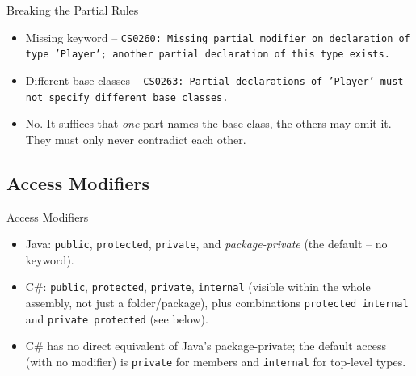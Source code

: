 \begin{solutionframe}{Breaking the Partial Rules}
  \begin{itemize}
    \item Missing keyword -- \texttt{CS0260: Missing partial modifier on
      declaration of type 'Player'; another partial declaration of this type
      exists.}
    \item Different base classes -- \texttt{CS0263: Partial declarations of
      'Player' must not specify different base classes.}
    \item No. It suffices that \emph{one} part names the base class, the others
      may omit it. They must only never contradict each other.
  \end{itemize}
  \vspace{4ex}

\end{solutionframe}

\subsection{Access Modifiers}

\begin{frame}{Access Modifiers}
  \begin{itemize}
    \item Java: \texttt{public}, \texttt{protected}, \texttt{private},
      and \emph{package-private} (the default -- no keyword).
    \item C\#: \texttt{public}, \texttt{protected}, \texttt{private},
      \texttt{internal} (visible within the whole assembly, not just a
      folder/package), plus combinations
      \texttt{protected internal} and \texttt{private protected} (see below).
    \item C\# has no direct equivalent of Java's package-private; the
      default access (with no modifier) is \texttt{private} for members
      and \texttt{internal} for top-level types.
  \end{itemize}
\end{frame}


